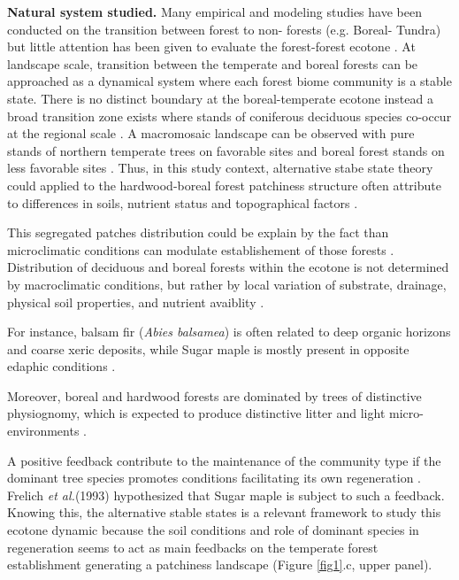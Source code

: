 \textbf{Natural system studied.} Many empirical and modeling studies have been
conducted on the transition between forest to non- forests (e.g. Boreal-
Tundra) \cite{Scheffer2012,Scheffer2001,Hirota2011,Messaoud2007} but little
attention has been given to evaluate the forest-forest ecotone
\cite{Goldblum2010,Graignic2013,Messaoud2007}. At landscape scale, transition
between  the temperate and boreal forests can be approached as a dynamical
system where each forest biome community is a stable state. There is no
distinct boundary at the boreal-temperate ecotone instead a broad transition
zone exists where stands of coniferous deciduous species co-occur at the
regional scale \cite{Goldblum2010}. A macromosaic landscape can be observed
with pure stands of northern temperate trees on favorable sites and boreal
forest stands on less favorable sites \cite{Goldblum2010,Fisichelli2013}.
Thus, in this study context, alternative stabe state theory could applied to the
hardwood-boreal forest patchiness structure often attribute to differences in
soils, nutrient status and topographical factors \cite{Society2014}.


This segregated patches distribution could be explain by
the fact than microclimatic conditions can modulate establishement of those
forests \cite{DeFrenne2013}. Distribution of deciduous and boreal forests
within the ecotone is not determined by macroclimatic conditions, but rather
by local variation of substrate, drainage, physical soil properties, and
nutrient avaiblity \cite{Goldblum2010,Society2014}.  

For instance, balsam fir
(\textit{Abies balsamea}) is often related to deep organic horizons and
coarse xeric deposits, while Sugar maple is mostly present in opposite edaphic
conditions \cite{Messaoud2007,Kellman2004,Barras1998}.


Moreover, boreal and hardwood forests are dominated by trees of distinctive
physiognomy, which is expected to produce distinctive litter and light
micro-environments \cite{Barras1998}.

A positive feedback contribute to the maintenance of the community type if the
dominant tree species promotes conditions facilitating its own regeneration
\cite{Barras1998}. Frelich \textit{et al.}(1993) \cite{Society2014}
hypothesized that Sugar maple is subject to such a feedback.  Knowing this,
the alternative stable states is a relevant framework to study this ecotone
dynamic because the soil conditions and role of dominant species in
regeneration seems to act as main feedbacks on the temperate forest
establishment generating a patchiness landscape (Figure \ref{fig1}.c, upper
panel).


